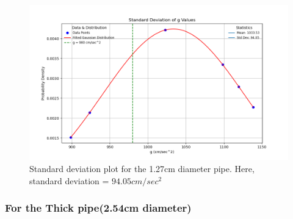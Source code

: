 \documentclass[twocolumn,11pt]{article}
\begin{document}
\begin{figure}[H]
    \centering
    \includegraphics[scale = 0.35]{std_dev_plot_thin.png}
    \caption{Standard deviation plot for the 1.27cm diameter pipe. Here, standard deviation = $94.05cm/sec^2$ }
    \label{fig:enter-label}
\end{figure}

\subsubsection{For the Thick pipe(2.54cm diameter)}
\end{document}
